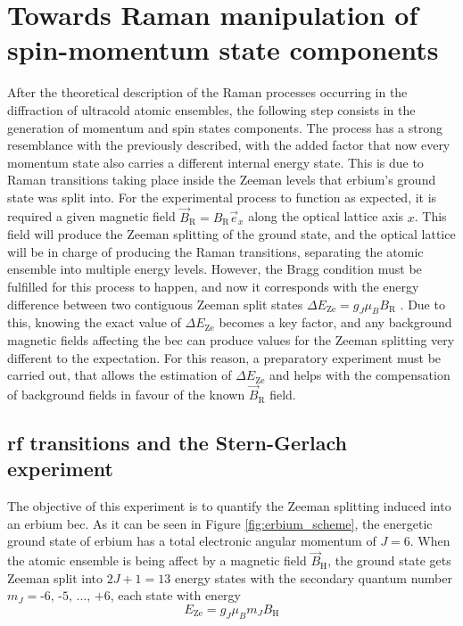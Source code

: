 
\chapter{Towards Raman manipulation of spin-momentum state components}
\label{chap:raman_manipulation}

After the theoretical description of the Raman processes occurring in the diffraction of ultracold atomic ensembles, the following step consists in the generation of momentum and spin states components. The process has a strong resemblance with the previously described, with the added factor that now every momentum state also carries a different internal energy state. This is due to Raman transitions taking place inside the Zeeman levels that erbium's ground state was split into. For the experimental process to function as expected, it is required a given magnetic field $\vec{B}_\text{R} = B_{\text{R}} \vec{e}_x$ along the optical lattice axis $x$. This field will produce the Zeeman splitting of the ground state, and the optical lattice will be in charge of producing the Raman transitions, separating the atomic ensemble into multiple energy levels. However, the Bragg condition must be fulfilled for this process to happen, and now it corresponds with the energy difference between two contiguous Zeeman split states $\Delta E_\text{Ze} = g_J \mu_B B_\text{R}$ \cite{Foot2005}. Due to this, knowing the exact value of $\Delta E_\text{Ze}$ becomes a key factor, and any background magnetic fields  affecting the \ac{bec} can produce values for the Zeeman splitting very different to the expectation. For this reason, a preparatory experiment must be carried out, that allows the estimation of $\Delta E_\text{Ze}$ and helps with the compensation of background fields in favour of the known $\vec{B}_\text{R}$ field.

\section{\Acl{rf} transitions and the Stern-Gerlach experiment}

The objective of this experiment is to quantify the Zeeman splitting induced into an erbium \ac{bec}. As it can be seen in Figure \ref{fig:erbium_scheme}, the energetic ground state of erbium has a total electronic angular momentum of $J = 6$. When the atomic ensemble is being affect by a magnetic field $\vec{B}_\text{H}$, the ground state gets Zeeman split into $2J+1 = 13$ energy states with the secondary quantum number $m_J = \text{-6, -5, ..., +6}$, each state with energy \cite{Foot2005}
\begin{equation}
	E_\text{Ze} = g_J \mu_B m_J B_\text{H}
\end{equation}

